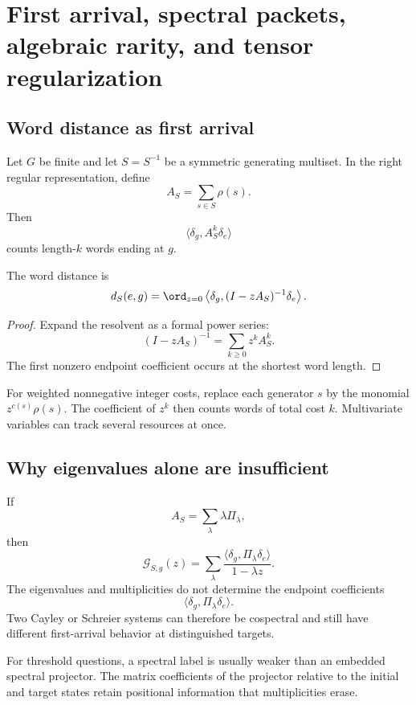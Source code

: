 \chapter{First arrival, spectral packets, algebraic rarity, and tensor regularization}\label{ch:spectral-algebraic}


\section{Word distance as first arrival}
Let $G$ be finite and let $S=S^{-1}$ be a symmetric generating multiset.  In the right regular representation, define
\[
A_S=\sum_{s\in S}\rho(s).
\]
Then
\[
\langle\delta_g,A_S^k\delta_e\rangle
\]
counts length-$k$ words ending at $g$.

\begin{theorem}
The word distance is
\[
d_S(e,g)
=
\ord_{z=0}
\left\langle
\delta_g,(I-zA_S)^{-1}\delta_e
\right\rangle.
\]
\end{theorem}
\begin{proof}
Expand the resolvent as a formal power series:
\[
(I-zA_S)^{-1}=\sum_{k\ge0}z^kA_S^k.
\]
The first nonzero endpoint coefficient occurs at the shortest word length.
\end{proof}

For weighted nonnegative integer costs, replace each generator $s$ by the monomial $z^{c(s)}\rho(s)$.  The coefficient of $z^k$ then counts words of total cost $k$.  Multivariate variables can track several resources at once.

\section{Why eigenvalues alone are insufficient}
If
\[
A_S=\sum_\lambda\lambda\Pi_\lambda,
\]
then
\[
\mathcal G_{S,g}(z)
=
\sum_\lambda
\frac{\langle\delta_g,\Pi_\lambda\delta_e\rangle}{1-\lambda z}.
\]
The eigenvalues and multiplicities do not determine the endpoint coefficients
\[
\langle\delta_g,\Pi_\lambda\delta_e\rangle.
\]
Two Cayley or Schreier systems can therefore be cospectral and still have different first-arrival behavior at distinguished targets.

\begin{principle}
For threshold questions, a spectral label is usually weaker than an embedded spectral projector.  The matrix coefficients of the projector relative to the initial and target states retain positional information that multiplicities erase.
\end{principle}


